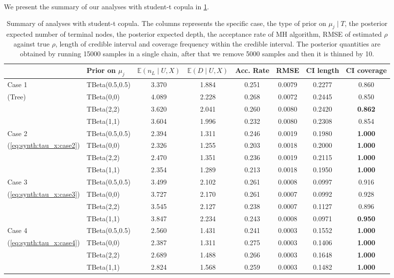 \documentclass{amsart}
\begin{document}
We present the summary of our analyses with student-t copula in \cref{tab:student-t:summary}. 


\begin{table}[ht]
	\centering
	\caption{Summary of analyses with student-t copula. The columns represents the specific case, the type of prior on $\mu_j\mid T$, the posterior expected number of terminal nodes, the posterior expected depth, the acceptance rate of MH algorithm, RMSE of estimated $\rho$ against true $\rho$, length of credible interval and coverage frequency within the credible interval. The posterior quantities are obtained by running 15000 samples in a single chain, after that we remove 5000 samples and then it is thinned by 10.}
	\label{tab:student-t:summary}
	\scriptsize{
	\begin{tabular}{ll|cccccc}
		\toprule
		& Prior on $\mu_j$ & $\mathbb{E}(n_L\mid U,X)$ & $\mathbb{E}(D\mid U,X)$ & Acc. Rate & RMSE & CI length & CI coverage \\ 
		\midrule
		Case 1 & TBeta(0.5,0.5) & 3.370 & 1.884 & 0.251 & 0.0079 & 0.2277 & 0.860 \\ 
		(Tree) & TBeta(0,0) & 4.089 & 2.228 & 0.268 & 0.0072 & 0.2445 & 0.850 \\ 
		& TBeta(2,2) & 3.620 & 2.041 & 0.260 & 0.0080 & 0.2420 & \textbf{0.862} \\ 
		& TBeta(1,1) & 3.604 & 1.996 & 0.232 & 0.0080 & 0.2308 & 0.854 \\ 
		\midrule
		Case 2 & TBeta(0.5,0.5) & 2.394 & 1.311 & 0.246 & 0.0019 & 0.1980 & \textbf{1.000} \\ 
		(\cref{eq:synth:tau_x:case2}) & TBeta(0,0) & 2.326 & 1.255 & 0.203 & 0.0018 & 0.2000 & \textbf{1.000} \\ 
		& TBeta(2,2) & 2.470 & 1.351 & 0.236 & 0.0019 & 0.2115 & \textbf{1.000} \\ 
		& TBeta(1,1) & 2.354 & 1.289 & 0.213 & 0.0018 & 0.1950 & \textbf{1.000} \\ 
		\midrule
		Case 3 & TBeta(0.5,0.5) & 3.499 & 2.102 & 0.261 & 0.0008 & 0.0997 & 0.916 \\ 
		(\cref{eq:synth:tau_x:case3}) & TBeta(0,0) & 3.727 & 2.170 & 0.261 & 0.0007 & 0.0992 & 0.928 \\ 
		& TBeta(2,2) & 3.545 & 2.127 & 0.238 & 0.0007 & 0.1127 & 0.896 \\ 
		& TBeta(1,1) & 3.847 & 2.234 & 0.243 & 0.0008 & 0.0971 & \textbf{0.950} \\ 
		\midrule
		Case 4 & TBeta(0.5,0.5) & 2.560 & 1.431 & 0.241 & 0.0003 & 0.1552 & \textbf{1.000} \\ 
		(\cref{eq:synth:tau_x:case4}) & TBeta(0,0) & 2.387 & 1.311 & 0.275 & 0.0003 & 0.1406 & \textbf{1.000} \\ 
		& TBeta(2,2) & 2.689 & 1.488 & 0.266 & 0.0003 & 0.1648 & \textbf{1.000} \\ 
		& TBeta(1,1) & 2.824 & 1.568 & 0.259 & 0.0003 & 0.1482 & \textbf{1.000} \\ 
		\end{tabular}}
\end{table}
\end{document}
